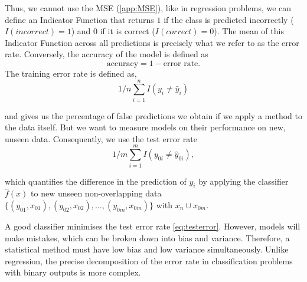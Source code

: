 \documentclass[12pt,a4paper,titlepage]{article}
\numberwithin{equation}{section}
\numberwithin{table}{section}
\numberwithin{figure}{section}
\begin{document}
    \noindent Thus, we cannot use the MSE (\ref{app:MSE}), like in regression problems, we can define an Indicator Function that returns $1$ if the class is predicted incorrectly ($I(incorrect)=1$) and $0$ if it is correct ($I(correct)=0$). The mean of this Indicator Function across all predictions is precisely what we refer to as the error rate. Conversely, the accuracy of the model is defined as
    \begin{equation}\label{eq:accuracy}
    \text{accuracy} = 1 - \text{error rate}.
    \end{equation}
    \noindent The training error rate is defined as,
    \begin{equation}
    \label{eg:trainingerror}
    1/n \sum_{i=1}^n I(y_i \neq \hat{y}_i)
    \end{equation}
    
    \noindent and gives us the percentage of false predictions we obtain if we apply a method to the data itself. But we want to measure models on their performance on new, unseen data. Consequently, we use the test error rate
    \begin{equation}
    \label{eq:testerror}
    1/m \sum_{i=1}^m I(y_{0i} \neq \hat{y}_{0i}),
    \end{equation}
    
    \noindent which quantifies the difference in the prediction of $y_i$ by applying the classifier $\hat{f}(x)$ to new unseen non-overlapping data $\{(y_{01},x_{01}), (y_{02},x_{02}),\dots, (y_{0m},x_{0m})\}$ with $x_n \cup x_{0m}$.

    A good classifier minimises the test error rate \ref{eq:testerror}. However, models will make mistakes, which can be broken down into bias and variance. Therefore, a statistical method must have low bias and low variance simultaneously. Unlike regression, the precise decomposition of the error rate in classification problems with binary outputs is more complex.
    
\end{document}
